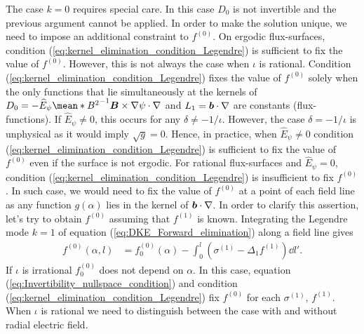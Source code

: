  	The case $k=0$ requires special care. In this case $D_0$ is not invertible and the previous argument cannot be applied. In order to make the solution unique, we need to impose an additional constraint to $f^{(0)}$. On ergodic flux-surfaces, condition (\ref{eq:kernel_elimination_condition_Legendre}) is sufficient to fix the value of $f^{(0)}$. However, this is not always the case when $\iota$ is rational. Condition (\ref{eq:kernel_elimination_condition_Legendre}) fixes the value of $f^{(0)}$ solely when the only functions that lie simultaneously at the kernels of $D_0 = -\widehat{E}_\psi \mean*{B^2}^{-1} \vb*{B}\times\nabla\psi\cdot\nabla$ and $L_1=\vb*{b}\cdot\nabla$ are constants (flux-functions). If $\widehat{E}_\psi \ne 0$, this occurs for any $\delta\ne -1/\iota $. However, the case $\delta= -1/\iota$ is unphysical as it would imply $\sqrt{g}=0$. Hence, in practice, when $\widehat{E}_\psi \ne 0$ condition (\ref{eq:kernel_elimination_condition_Legendre}) is sufficient to fix the value of $f^{(0)}$ even if the surface is not ergodic. For rational flux-surfaces and $\widehat{E}_\psi = 0$, condition (\ref{eq:kernel_elimination_condition_Legendre}) is insufficient to fix $f^{(0)}$. In such case, we would need to fix the value of $f^{(0)}$ at a point of each field line as any function $g(\alpha)$ lies in the kernel of $\vb*{b}\cdot\nabla$. In order to clarify this assertion, let's try to obtain $f^{(0)}$ assuming that $f^{(1)}$ is known. Integrating the Legendre mode $k=1$ of equation (\ref{eq:DKE_Forward_elimination}) along a field line gives
%
\begin{align}
	f^{(0)}(\alpha,l)
	& =
	f^{(0)}_0(\alpha)
	\label{eq:Invertibility_nullspace_condition}
	-
	\int_{0}^{l}
	\left(
	\sigma^{(1)}
	- \Delta_1 f^{(1)} 
	\right)\dd{l'}.
\end{align} 
If $\iota$ is irrational $f_0^{(0)}$ does not depend on $\alpha$. In this case, equation (\ref{eq:Invertibility_nullspace_condition}) and condition (\ref{eq:kernel_elimination_condition_Legendre}) fix $f^{(0)}$ for each $\sigma^{(1)}$, $f^{(1)}$. When $\iota$ is rational we need to distinguish between the case with and without radial electric field. 
